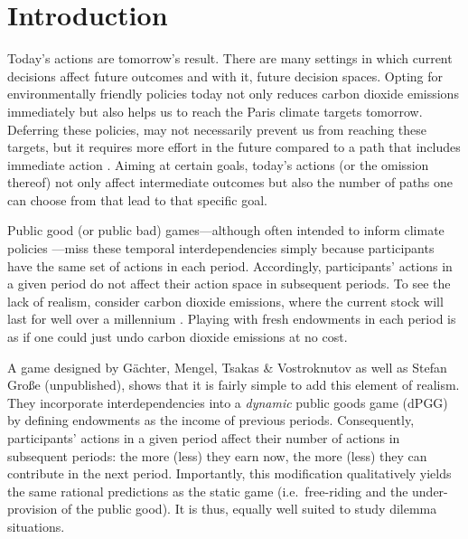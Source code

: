 \documentclass[
  authoryear,
  review,
  3p,
  onecolumn]{elsarticle}
\begin{document}
\hypertarget{sec-intro}{%
\section{Introduction}\label{sec-intro}}

Today's actions are tomorrow's result. There are many settings in which
current decisions affect future outcomes and with it, future decision
spaces. Opting for environmentally friendly policies today not only
reduces carbon dioxide emissions immediately but also helps us to reach
the Paris climate targets tomorrow. Deferring these policies, may not
necessarily prevent us from reaching these targets, but it requires more
effort in the future compared to a path that includes immediate action
\citep{HaenselEtAl2022}. Aiming at certain goals, today's actions (or
the omission thereof) not only affect intermediate outcomes but also the
number of paths one can choose from that lead to that specific goal.

Public good (or public bad) games---although often intended to inform
climate policies
\citep[e.g.][]{MilinskiEtAl2006, TavoniEtAl2011, Hauser2014, BrickEtAl2015, GomezEtAl2018, CalzolariEtAl2018, CookEtAl2019}---miss
these temporal interdependencies simply because participants have the
same set of actions in each period. Accordingly, participants' actions
in a given period do not affect their action space in subsequent
periods. To see the lack of realism, consider carbon dioxide emissions,
where the current stock will last for well over a millennium
\citep{Inman2008, CalzolariEtAl2018}. Playing with fresh endowments in
each period is as if one could just undo carbon dioxide emissions at no
cost.

A game designed by Gächter, Mengel, Tsakas \& Vostroknutov \citeyearpar[
hereafter, GMTV]{GMTV2017} as well as Stefan Große (unpublished), shows
that it is fairly simple to add this element of realism. They
incorporate interdependencies into a \emph{dynamic} public goods game
(dPGG) by defining endowments as the income of previous periods.
Consequently, participants' actions in a given period affect their
number of actions in subsequent periods: the more (less) they earn now,
the more (less) they can contribute in the next period. Importantly,
this modification qualitatively yields the same rational predictions as
the static game (i.e.~free-riding and the under-provision of the public
good). It is thus, equally well suited to study dilemma situations.
\end{document}
